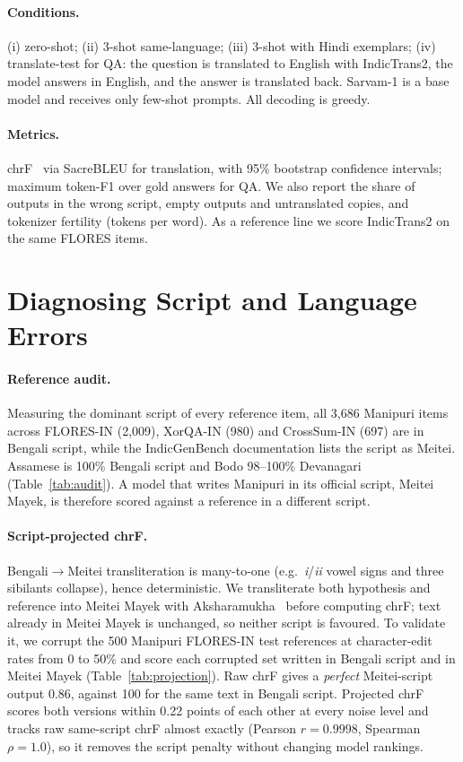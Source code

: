 \documentclass[11pt]{article}
\begin{document}
\paragraph{Conditions.} (i) zero-shot; (ii) 3-shot same-language; (iii) 3-shot with Hindi exemplars;
(iv) translate-test for QA: the question is translated to English with IndicTrans2, the model answers
in English, and the answer is translated back. Sarvam-1 is a base model and receives only few-shot prompts.
All decoding is greedy.
\paragraph{Metrics.} chrF~\citep{popovic2015chrf} via SacreBLEU for translation, with 95\% bootstrap
confidence intervals; maximum token-F1 over gold answers for QA. We also report the share of outputs
in the wrong script, empty outputs and untranslated copies, and tokenizer fertility (tokens per word).
As a reference line we score IndicTrans2 on the same FLORES items.

\section{Diagnosing Script and Language Errors}
\label{sec:diagnostics}
\paragraph{Reference audit.} Measuring the dominant script of every reference item, all 3{,}686
Manipuri items across FLORES-IN (2{,}009), XorQA-IN (980) and CrossSum-IN (697) are in Bengali
script, while the IndicGenBench documentation lists the script as Meitei. Assamese is 100\% Bengali
script and Bodo 98--100\% Devanagari (Table~\ref{tab:audit}). A model that writes Manipuri in its
official script, Meitei Mayek, is therefore scored against a reference in a different script.

\paragraph{Script-projected chrF.} Bengali$\rightarrow$Meitei transliteration is many-to-one
(e.g.\ \textit{i}/\textit{ii} vowel signs and three sibilants collapse), hence deterministic. We
transliterate both hypothesis and reference into Meitei Mayek with Aksharamukha~\citep{aksharamukha}
before computing chrF; text already in Meitei Mayek is unchanged, so neither script is favoured.
To validate it, we corrupt the 500 Manipuri FLORES-IN test references at character-edit rates from
0 to 50\% and score each corrupted set written in Bengali script and in Meitei Mayek
(Table~\ref{tab:projection}). Raw chrF gives a \emph{perfect} Meitei-script output 0.86, against 100
for the same text in Bengali script. Projected chrF scores both versions within 0.22 points of each
other at every noise level and tracks raw same-script chrF almost exactly (Pearson $r=0.9998$,
Spearman $\rho=1.0$), so it removes the script penalty without changing model rankings.
\end{document}
